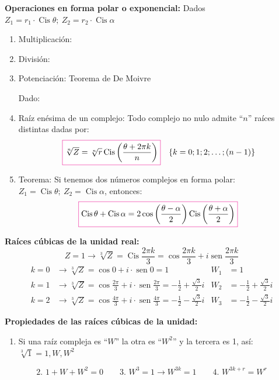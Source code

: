 \documentclass[11pt,a4paper]{article}
\begin{document}
\textcolor{rojo}{\textbf{Operaciones en forma polar o exponencial:}} Dados
$Z_1 = r_1\cdot\operatorname{Cis}\theta;\ Z_2 = r_2\cdot\operatorname{Cis}\alpha$
\begin{enumerate}
  \item \textcolor{azul}{Multiplicación:} \
  \item \textcolor{azul}{División:} \
  \item \textcolor{azul}{Potenciación:} Teorema de De Moivre

  Dado: \ 
  \item \textcolor{azul}{Raíz enésima de un complejo:} Todo complejo no nulo admite ``$n$''
  raíces distintas dadas por:
  \[
  \fcolorbox{magenta}{white}{$\sqrt[n]{Z} = \sqrt[n]{r}\operatorname{Cis}\left(\dfrac{\theta + 2\pi k}{n}\right)$}
  \quad \{k = 0; 1; 2; \ldots; (n-1)\}
  \]
  \item \textcolor{azul}{Teorema:} Si tenemos dos números complejos en forma polar:
  $Z_1 = \operatorname{Cis}\theta;\ Z_2 = \operatorname{Cis}\alpha$, entonces:
  \[
  \fcolorbox{magenta}{white}{$\operatorname{Cis}\theta + \operatorname{Cis}\alpha = 2\cos\left(\dfrac{\theta - \alpha}{2}\right)\operatorname{Cis}\left(\dfrac{\theta + \alpha}{2}\right)$}
  \]
\end{enumerate}

\textcolor{rojo}{\textbf{Raíces cúbicas de la unidad real:}}
\[Z = 1 \rightarrow \sqrt[3]{Z} = \operatorname{Cis}\frac{2\pi k}{3} = \cos\frac{2\pi k}{3} + i\operatorname{sen}\frac{2\pi k}{3}\]
\begin{align*}
k = 0 &\rightarrow \sqrt[3]{Z} = \cos 0 + i\cdot\operatorname{sen}0 = 1 & W_1 &= 1\\
k = 1 &\rightarrow \sqrt[3]{Z} = \cos\frac{2\pi}{3} + i\cdot\operatorname{sen}\frac{2\pi}{3} = -\frac{1}{2} + \frac{\sqrt{3}}{2}i & W_2 &= -\frac{1}{2} + \frac{\sqrt{3}}{2}i\\
k = 2 &\rightarrow \sqrt[3]{Z} = \cos\frac{4\pi}{3} + i\cdot\operatorname{sen}\frac{4\pi}{3} = -\frac{1}{2} - \frac{\sqrt{3}}{2}i & W_3 &= -\frac{1}{2} - \frac{\sqrt{3}}{2}i
\end{align*}

\textcolor{rojo}{\textbf{Propiedades de las raíces cúbicas de la unidad:}}
\begin{enumerate}
  \item Si una raíz compleja es ``$W$'' la otra es ``$W^2$'' y la tercera es 1, así:
  $\sqrt[3]{1} = 1, W, W^2$
\end{enumerate}
\[
\text{2. } 1 + W + W^2 = 0 \qquad
\text{3. } W^3 = 1 \rightarrow W^{3k} = 1 \qquad
\text{4. } W^{3k + r} = W^r
\]
\end{document}
